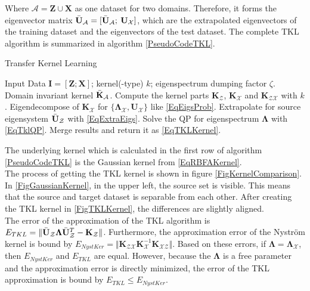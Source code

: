 Where $\mathcal{A}= \mathbf{Z} \cup \mathbf{X}$ as one dataset for two domains.
Therefore, it forms the eigenvector matrix $ \bar{\mathbf{U}}_\mathcal{A} =[ \bar{\mathbf{U}}_\mathcal{A};\>  \mathbf{U}_\mathcal{X}]$, which are the extrapolated eigenvectors of the training dataset and the eigenvectors of the test dataset.\newline
The complete \acs{TKL} algorithm is summarized in algorithm \ref{PseudoCodeTKL}.\cite{Long.2015}
\begin{algorithm}
	\caption{Transfer Kernel Learning}\label{PseudoCodeTKL}	
	\begin{algorithmic}[1]
		\Require Input Data $\mathbf{I} = [\mathbf{Z};\mathbf{X}]$; kernel(-type) $k$; eigenspectrum dumping factor $\zeta$.
		\Ensure Domain invariant kernel $\bar{\mathbf{K}}_\mathcal{A}$.
		\State Compute the kernel parts $\mathbf{K}_\mathcal{Z}$, $\mathbf{K}_\mathcal{X}$ and $\mathbf{K}_\mathcal{ZX}$ with $k$.
		\State Eigendecompose of $\mathbf{K}_\mathcal{X}$ for $\{\mathbf{\Lambda}_\mathcal{X}, \mathbf{U}_\mathcal{X}\}$ like \eqref{EqEigsProb}.
		\State Extrapolate for source eigensystem  $\bar{\mathbf{U}}_\mathcal{Z}$ with \eqref{EqExtraEigs}.
		\State Solve the \acs{QP} for eigenspectrum $\mathbf{\Lambda}$ with \eqref{EqTklQP}.
		\State Merge results and return it as \eqref{EqTKLKernel}.
	\end{algorithmic}
\end{algorithm}
The underlying kernel which is calculated in the first row of algorithm \ref{PseudoCodeTKL} is the Gaussian kernel from \eqref{EqRBFAKernel}.\\
The process of getting the \acs{TKL} kernel is shown in figure \ref{FigKernelComparison}. In \ref{FigGaussianKernel}, in the upper left, the source set is visible.
This means that the source and target dataset is separable from each other.
After creating the \acs{TKL} kernel in \ref{FigTKLKernel}, the differences are slightly aligned.\\
The error of the approximation of the \acl{TKL} algorithm is $E_{TKL} = \Vert \bar{\mathbf{U}}_\mathcal{Z} \boldsymbol{\Lambda}\bar{\mathbf{U}}_\mathcal{Z}^T - \mathbf{K}_\mathcal{Z}\Vert$.
Furthermore, the approximation error of the Nyström kernel is bound by $E_{NystKer} = \Vert \mathbf{K}_{\mathcal{ZX}} \mathbf{K}_{\mathcal{X}}^{-1}\mathbf{K}_{\mathcal{XZ}}\Vert$.
Based on these errors, if $\boldsymbol{\Lambda} = \boldsymbol{\Lambda}_\mathcal{X}$, then $E_{NystKer}$ and $E_{TKL}$ are equal. 
However, because the $\boldsymbol{\Lambda}$ is a free parameter and the approximation error is directly minimized, the error of the \acs{TKL} approximation is bound by $E_{TKL}\le E_{NystKer}$.\cite{Long.}\\
